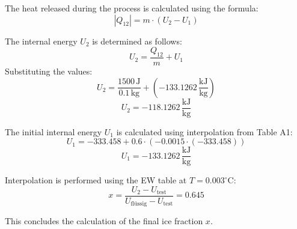 The heat released during the process is calculated using the formula:  
\[
|Q_{12}| = m \cdot (U_2 - U_1)
\]  

The internal energy \( U_2 \) is determined as follows:  
\[
U_2 = \frac{Q_{12}}{m} + U_1
\]  
Substituting the values:  
\[
U_2 = \frac{1500 \, \text{J}}{0.1 \, \text{kg}} + (-133.1262 \, \frac{\text{kJ}}{\text{kg}})
\]  
\[
U_2 = -118.1262 \, \frac{\text{kJ}}{\text{kg}}
\]  

The initial internal energy \( U_1 \) is calculated using interpolation from Table A1:  
\[
U_1 = -333.458 + 0.6 \cdot (-0.0015 \cdot (-333.458))
\]  
\[
U_1 = -133.1262 \, \frac{\text{kJ}}{\text{kg}}
\]  

Interpolation is performed using the EW table at \( T = 0.003^\circ \text{C} \):  
\[
x = \frac{U_2 - U_{\text{test}}}{U_{\text{flüssig}} - U_{\text{test}}} = 0.645
\]  

This concludes the calculation of the final ice fraction \( x \).